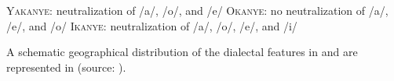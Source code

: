 \documentclass[output=paper,modfonts,newtxmath,hidelinks,]{langscibook}
\begin{document}
\label{5:12}
\ea \textsc{Yakanye:} neutralization of /a/, /o/, and /e/
\ex \textsc{Okanye:} no neutralization of /a/, /e/, and /o/
\ex \textsc{Ikanye:} neutralization of /a/, /o/, /e/, and /i/
\z\z

\noindent A schematic geographical distribution of the dialectal features in  and  are represented in  (source: \citealt{Bukrinskaja-etal1994}).

\begin{figure}
\end{figure}
\end{document}
